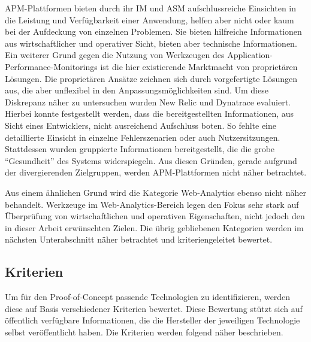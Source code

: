 APM-Plattformen bieten durch ihr IM und ASM aufschlussreiche Einsichten in die Leistung und Verfügbarkeit einer Anwendung, helfen aber nicht oder kaum bei der Aufdeckung von einzelnen Problemen. Sie bieten hilfreiche Informationen aus wirtschaftlicher und operativer Sicht, bieten aber technische Informationen. Ein weiterer Grund gegen die Nutzung von Werkzeugen des Application-Performance-Monitorings ist die hier existierende Marktmacht von proprietären Lösungen. Die proprietären Ansätze zeichnen sich durch vorgefertigte Lösungen aus, die aber unflexibel in den Anpassungsmöglichkeiten sind. Um diese Diskrepanz näher zu untersuchen wurden New Relic und Dynatrace evaluiert. Hierbei konnte festgestellt werden, dass die bereitgestellten Informationen, aus Sicht eines Entwicklers, nicht ausreichend Aufschluss boten. So fehlte eine detaillierte Einsicht in einzelne Fehlerszenarien oder auch Nutzersitzungen. Stattdessen wurden gruppierte Informationen bereitgestellt, die die grobe \enquote{Gesundheit} des Systems widerspiegeln. Aus diesen Gründen, gerade aufgrund der divergierenden Zielgruppen, werden APM-Plattformen nicht näher betrachtet.

Aus einem ähnlichen Grund wird die Kategorie Web-Analytics ebenso nicht näher behandelt. Werkzeuge im Web-Analytics-Bereich legen den Fokus sehr stark auf Überprüfung von wirtschaftlichen und operativen Eigenschaften, nicht jedoch den in dieser Arbeit erwünschten Zielen. Die übrig gebliebenen Kategorien werden im nächsten Unterabschnitt näher betrachtet und kriteriengeleitet bewertet.

\subsection{Kriterien}

Um für den Proof-of-Concept passende Technologien zu identifizieren, werden diese auf Basis verschiedener Kriterien bewertet. Diese Bewertung stützt sich auf öffentlich verfügbare Informationen, die die Hersteller der jeweiligen Technologie selbst veröffentlicht haben. Die Kriterien werden folgend näher beschrieben.

